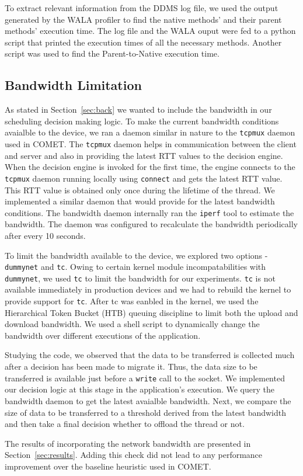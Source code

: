 To extract relevant information from the DDMS log file, we used the output generated by the WALA profiler to find the native methods' and their
parent methods' execution time. The log file and the WALA ouput were fed to a python script that printed the execution times of all the
necessary methods. Another script was used to find the Parent-to-Native execution time.




\subsection{Bandwidth Limitation}
As stated in Section~\ref{sec:back} we wanted to include the bandwidth in our scheduling decision making logic. To make the current bandwidth conditions avaialble to the device, we ran a daemon similar in nature to the \texttt{tcpmux} daemon used in COMET. The \texttt{tcpmux} daemon helps in communication between the client and server and also in providing the latest RTT values to the decision engine. When the decision engine is invoked for the first time, the engine connects to the \texttt{tcpmux} daemon running locally using \texttt{connect} and gets the latest RTT value. This RTT value is obtained only once during the lifetime of the thread. We implemented a similar daemon that would provide for the latest bandwidth conditions. The bandwidth daemon internally ran the \texttt{iperf} tool to estimate the bandwidth. The daemon was configured to recalculate the bandwidth periodically after every 10 seconds.

To limit the bandwidth available to the device, we explored two options - \texttt{dummynet} and \texttt{tc}. Owing to certain kernel module incompatabilities with \texttt{dummynet}, we used \texttt{tc} to limit the bandwidth for our experiments. \texttt{tc} is not available immediately in production devices and we had to rebuild the kernel to provide support for \texttt{tc}. After tc was eanbled in the kernel, we used the Hierarchical Token Bucket (HTB) queuing discipline to limit both the upload and download bandwidth. We used a shell script to dynamically change the bandwidth over different executions of the application.

Studying the code, we observed that the data to be transferred is collected much after a decision has been made to migrate it. Thus, the data size to be transferred is available just before a \texttt{write} call to the socket. We implemented our decision logic at this stage in the application's execution. We query the bandwidth daemon to get the latest avaialble bandwidth. Next, we compare the size of data to be transferred to a threshold derived from the latest bandwidth and then take a final decision whether to offload the thread or not.

The results of incorporating the network bandwidth are presented in Section~\ref{sec:results}. Adding this check did not lead to any performance improvement
over the baseline heuristic used in COMET.
